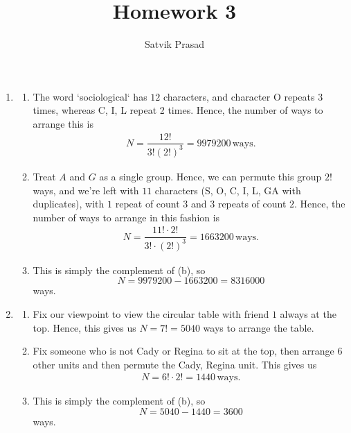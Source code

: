 \documentclass[12pt]{article}
\title{Homework 3}
\author{Satvik Prasad}
\date{}
\begin{document}
\begin{enumerate}
  \item
    \begin{enumerate}
      \item The word `sociological` has $12$ characters, and
        character O repeats 3 times, whereas C, I, L repeat 2 times.
        Hence, the number of ways to arrange this is
        \begin{align*}
          N = \dfrac{12!}{3! (2!)^3} = 9979200\, \text{ways}.
        \end{align*}

      \item Treat $A$ and $G$ as a single group. Hence, we can
        permute this group $2!$ ways, and we're left with $11$
        characters (S, O, C, I, L, GA with duplicates), with $1$
        repeat of count $3$ and $3$ repeats of count $2$. Hence, the
        number of ways to arrange in this fashion is
        \begin{align*}
          N = \dfrac{11! \cdot 2!}{3! \cdot (2!)^3} = 1663200\, \text{ways}.
        \end{align*}

      \item This is simply the complement of (b), so $$N = 9979200 -
        1663200 = 8316000$$ ways.
    \end{enumerate}

  \item
    \begin{enumerate}
      \item Fix our viewpoint to view the circular table with friend
        $1$ always at the top. Hence, this gives us $N = 7! = 5040$
        ways to arrange the table.

      \item Fix someone who is not Cady or Regina to sit at the top,
        then arrange $6$ other units and then permute the {Cady,
        Regina} unit. This gives us
        \begin{align*}
          N = 6! \cdot 2! = 1440\, \text{ways}.
        \end{align*}

      \item This is simply the complement of (b), so $$N = 5040 -
        1440 = 3600$$ ways.
    \end{enumerate}


\end{enumerate}
\end{document}
